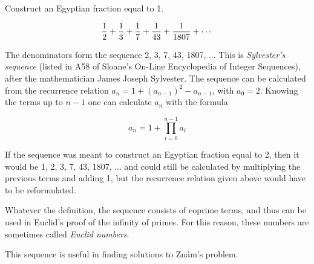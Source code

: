 \documentclass{article}
\begin{document}
Construct an Egyptian fraction equal to 1.

$${1 \over 2} + {1 \over 3} + {1 \over 7} + {1 \over {43}} + {1 \over {1807}} + \cdots$$

The denominators form the sequence 2, 3, 7, 43, 1807, ... This is {\em Sylvester's sequence} (listed in A58 of Sloane's On-Line Encyclopedia of Integer Sequences), after the mathematician James Joseph Sylvester. The sequence can be calculated from the recurrence relation $a_n = 1 + (a_{n - 1})^2 - a_{n - 1}$, with $a_0 = 2$. Knowing the terms up to $n - 1$ one can calculate $a_n$ with the formula

$$a_n = 1 + \prod_{i = 0}^{n - 1} a_i$$

If the sequence was meant to construct an Egyptian fraction equal to 2, then it would be 1, 2, 3, 7, 43, 1807, ... and could still be calculated by multiplying the previous terms and adding 1, but the recurrence relation given above would have to be reformulated.

Whatever the definition, the sequence consists of coprime terms, and thus can be used in Euclid's proof of the infinity of primes. For this reason, these numbers are sometimes called {\em Euclid numbers}.

This sequence is useful in finding solutions to Zn\'am's problem.
\end{document}

